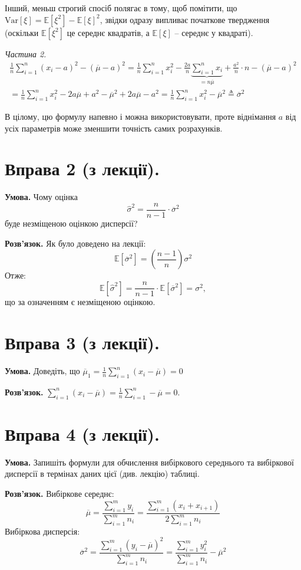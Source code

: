\documentclass[14pt]{extarticle}
\begin{document}
Інший, меньш строгий спосіб полягає в тому, щоб помітити, що $\text{Var}[\xi] = \mathbb{E}[\xi^2]-\mathbb{E}[\xi]^2$, звідки одразу випливає початкове твердження (оскільки $\mathbb{E}[\xi^2]$ це середнє квадратів, а $\mathbb{E}[\xi]$ -- середнє у квадраті). 

\textit{Частина 2.}
\begin{gather*}
\frac{1}{n}\sum_{i=1}^n (x_i-a)^2 - (\overline{\mu}-a)^2 = \frac{1}{n}\sum_{i=1}^n x_i^2 - \frac{2a}{n}\underbrace{\sum_{i=1}^n x_i}_{=n\overline{\mu}} + \frac{a^2}{n} \cdot n - (\overline{\mu}-a)^2 \\
= \frac{1}{n}\sum_{i=1}^n x_i^2 - 2a\overline{\mu} + a^2 - \overline{\mu}^2 + 2a\overline{\mu} - a^2 = \frac{1}{n}\sum_{i=1}^n x_i^2 - \overline{\mu}^2 \triangleq \overline{\sigma}^2
\end{gather*}

В цілому, цю формулу напевно і можна використовувати, проте віднімання $a$ від усіх параметрів може зменшити точність самих розрахунків.

\section*{Вправа 2 (з лекції).}

\textbf{Умова.} Чому оцінка 
\[
\hat{\sigma}^2 = \frac{n}{n-1} \cdot \overline{\sigma}^2
\]
буде незміщеною оцінкою дисперсії?

\textbf{Розв'язок.} Як було доведено на лекції:
\[
\mathbb{E}[\overline{\sigma}^2] = \left(\frac{n-1}{n}\right)\sigma^2
\]
Отже:
\[
\mathbb{E}[\hat{\sigma}^2] = \frac{n}{n-1} \cdot \mathbb{E}[\overline{\sigma}^2] = \sigma^2,
\]
що за означенням є незміщеною оцінкою.

\section*{Вправа 3 (з лекції).} 

\textbf{Умова.} Доведіть, що $\overline{\mu}_1 = \frac{1}{n}\sum_{i=1}^n(x_i-\overline{\mu})=0$

\textbf{Розв'язок.} $\sum_{i=1}^n(x_i-\overline{\mu}) = \frac{1}{n}\sum_{i=1}^n-\overline{\mu}=0$.

\section*{Вправа 4 (з лекції).}
\textbf{Умова.} Запишіть формули для обчислення вибіркового середнього та
вибіркової дисперсії в термінах даних цієї (див. лекцію) таблиці.

\textbf{Розв'язок.} Вибіркове середнє:
\[
\overline{\mu} = \frac{\sum_{i=1}^m y_i}{\sum_{i=1}^m n_i} = \frac{\sum_{i=1}^m (x_i+x_{i+1})}{2\sum_{i=1}^mn_i}
\]
Вибіркова дисперсія:
\[
\overline{\sigma}^2 = \frac{\sum_{i=1}^m (y_i-\overline{\mu})^2}{\sum_{i=1}^m n_i} = \frac{\sum_{i=1}^m y_i^2}{\sum_{i=1}^m n_i} - \overline{\mu}^2
\]
\end{document}
